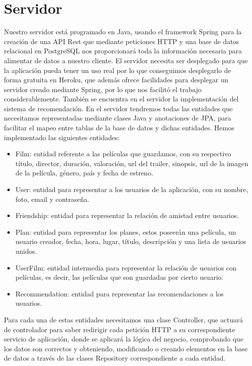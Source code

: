 \section{Servidor}
\label{makereference4.3}
Nuestro servidor está programado en Java, usando el framework Spring para la creación de una API Rest que mediante peticiones HTTP y una base de datos relacional en PostgreSQL nos proporcionará
toda la información necesaria para alimentar de datos a nuestro cliente. El servidor necesita ser desplegado para que la aplicación pueda tener un uso real por lo que conseguimos desplegarlo de forma gratuita en Heroku, que además ofrece
facilidades para desplegar un servidor creado mediante Spring, por lo que nos facilitó el trabajo considerablemente. También se encuentra en el servidor la implementación del sistema de recomendación.
En el servidor tendremos todas las entidades que necesitamos representadas mediante clases Java y anotaciones de JPA, para facilitar el mapeo entre tablas de la base de datos y dichas entidades. Hemos implementado las siguientes entidades:
\begin{itemize}
    \item Film: entidad referente a las películas que guardamos, con su respectivo título, director, duración, valoración, url del trailer, sinopsis, url de la imagen de la película, género, país y fecha de estreno.
    \item User: entidad para representar a los usuarios de la aplicación, con su nombre, foto, email y contraseña.
    \item Friendship: entidad para representar la relación de amistad entre usuarios.
    \item Plan: entidad para representar los planes, estos poseerán una película, un usuario creador, fecha, hora, lugar, título, descripción y una lista de usuarios unidos.
    \item UserFilm: entidad intermedia para representar la relación de usuarios con películas, es decir, las películas que son guardadas por cierto usuario.
    \item Recommendation: entidad para representar las recomendaciones a los usuarios.
\end{itemize}
Para cada una de estas entidades necesitamos una clase Controller, que actuará de controlador para saber redirigir cada petición HTTP a su correspondiente servicio de aplicación, donde se aplicará la lógica del negocio, comprobando 
que los datos son correctos y obteniendo, modificando o creando elementos en la base de datos a través de las clases Repository correspondiente a cada entidad.
